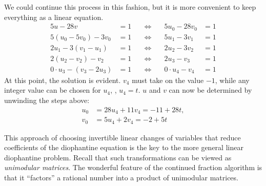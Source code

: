 We could continue this process in this fashion, but it is more
convenient to keep everything as a linear equation.  
\begin{equation}\label{Dio:2D:Steps:Eq}
\begin{array}{rlcrl}
5u - 28v&=1 & \quad\Longleftrightarrow\quad & 5u_0 - 28v_0 & =1\\
5(u_0 - 5v_0) - 3v_0 &=1 & \quad\Longleftrightarrow\quad & 5u_1 - 3v_1 &=1\\ 
2u_1 - 3(v_1 - u_1) &=1 & \quad\Longleftrightarrow\quad & 2u_2 - 3v_2 &=1\\ 
2(u_2 - v_2) - v_2 &=1 & \quad\Longleftrightarrow\quad & 2u_3 - v_3 &=1 \\
0\cdot u_3 - (v_3 -2 u_3) &=1 & \quad\Longleftrightarrow\quad 
   & 0\cdot u_4 - v_4 &=1
\end{array}
\end{equation}
At this point, the solution is evident.  $v_4$ must take on the value
$-1$, while any integer value can be chosen for $u_4$, \eg, $u_4 = t$.
$u$ and $v$ can now be determined by unwinding the steps above:
\[
\begin{aligned}
u_0 &= 28u_4 + 11v_4 = -11 + 28t, \\
v_0 &= 5u_4 + 2v_4 = -2 + 5t
\end{aligned}
\]

This approach of choosing invertible linear changes of variables that
reduce coefficients of the diophantine equation is the key to the more
general linear diophantine problem.  Recall that such transformations
can be viewed as {\em unimodular matrices}.
The wonderful feature of the continued fraction algorithm is that it
``factors'' a rational number into a product of unimodular matrices.

